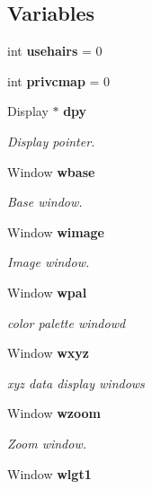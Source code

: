 \subsection*{Variables}
\begin{CompactItemize}
\item 
int {\bf usehairs} = 0\label{xtvutils_8c_a3}

\item 
int {\bf privcmap} = 0\label{xtvutils_8c_a4}

\item 
Display $\ast$ {\bf dpy}\label{xtvutils_8c_a5}

\begin{CompactList}\small\item\em Display pointer. \item\end{CompactList}\item 
Window {\bf wbase}\label{xtvutils_8c_a6}

\begin{CompactList}\small\item\em Base window. \item\end{CompactList}\item 
Window {\bf wimage}\label{xtvutils_8c_a7}

\begin{CompactList}\small\item\em Image window. \item\end{CompactList}\item 
Window {\bf wpal}\label{xtvutils_8c_a8}

\begin{CompactList}\small\item\em color palette windowd \item\end{CompactList}\item 
Window {\bf wxyz}\label{xtvutils_8c_a9}

\begin{CompactList}\small\item\em xyz data display windows \item\end{CompactList}\item 
Window {\bf wzoom}\label{xtvutils_8c_a10}

\begin{CompactList}\small\item\em Zoom window. \item\end{CompactList}\item 
Window {\bf wlgt1}\label{xtvutils_8c_a11}


\end{CompactItemize}
